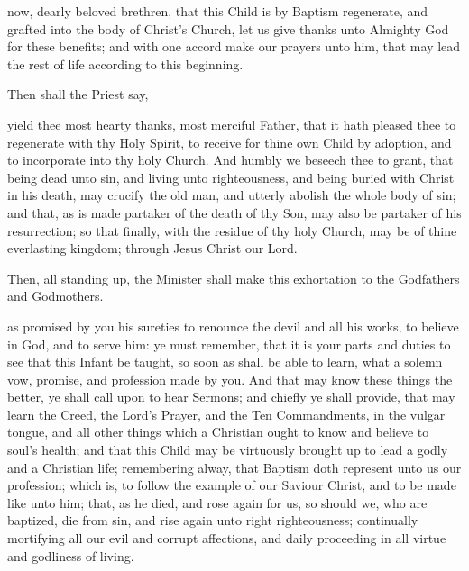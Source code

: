  now, dearly beloved brethren, that this Child is by Baptism regenerate, and grafted into the body of Christ's Church, let us give thanks unto Almighty God for these benefits; and with one accord make our prayers unto him, that  may lead the rest of  life according to this beginning.

\begin{rubric}
Then shall the Priest say,
\end{rubric}

 yield thee most hearty thanks, most merciful Father, that it hath pleased thee to regenerate  with thy Holy Spirit, to receive  for thine own Child by adoption, and to incorporate  into thy holy Church.
And humbly we beseech thee to grant, that  being dead unto sin, and living unto righteousness, and being buried with Christ in his death, may crucify the old man, and utterly abolish the whole body of sin; and that, as  is made partaker of the death of thy Son,  may also be partaker of his resurrection; so that finally, with the residue of thy holy Church,  may be  of thine everlasting kingdom; through Jesus Christ our Lord.

\begin{rubric}
Then, all standing up, the Minister shall make this exhortation to the Godfathers and Godmothers.
\end{rubric}

 as  promised by you his sureties to renounce the devil and all his works, to believe in God, and to serve him: ye must remember, that it is your parts and duties to see that this Infant be taught, so soon as  shall be able to learn, what a solemn vow, promise, and profession  made by you.
And that  may know these things the better, ye shall call upon  to hear Sermons; and chiefly ye shall provide, that  may learn the Creed, the Lord's Prayer, and the Ten Commandments, in the vulgar tongue, and all other things which a Christian ought to know and believe to  soul's health; and that this Child may be virtuously brought up to lead a godly and a Christian life; remembering alway, that Baptism doth represent unto us our profession; which is, to follow the example of our Saviour Christ, and to be made like unto him; that, as he died, and rose again for us, so should we, who are baptized, die from sin, and rise again unto right righteousness; continually mortifying all our evil and corrupt affections, and daily proceeding in all virtue and godliness of living.

